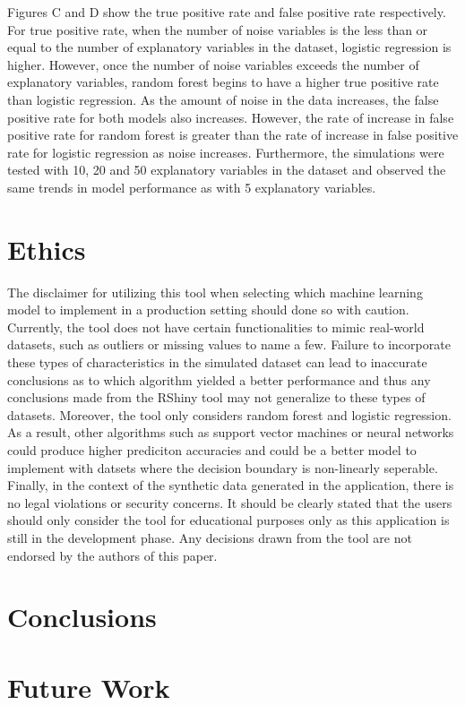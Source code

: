 \documentclass{llncs}
\begin{document}
Figures C and D show the true positive rate and false positive rate respectively.  For true positive rate, when the number of noise variables is the less than or equal to the number of explanatory variables in the dataset, logistic regression is higher.  However, once the number of noise variables exceeds the number of explanatory variables, random forest begins to have a higher true positive rate than logistic regression.  As the amount of noise in the data increases, the false positive rate for both models also increases.  However, the rate of increase in false positive rate for random forest is greater than the rate of increase in false positive rate for logistic regression as noise increases. Furthermore, the simulations were tested with 10, 20 and 50 explanatory variables in the dataset and observed the same trends in model performance as with 5 explanatory variables.

\section{Ethics}

The disclaimer for utilizing this tool when selecting which machine learning model to implement in a production setting should done so with caution. Currently, the tool does not have certain functionalities to mimic real-world datasets, such as outliers or missing values to name a few. Failure to incorporate these types of characteristics in the simulated dataset can lead to inaccurate conclusions as to which algorithm yielded a better performance and thus any conclusions made from the RShiny tool may not generalize to these types of datasets. Moreover, the tool only considers random forest and logistic regression. As a result, other algorithms such as support vector machines or neural networks could produce higher prediciton accuracies and could be a better model to implement with datsets where the decision boundary is non-linearly seperable. Finally, in the context of the synthetic data generated in the application, there is no legal violations or security concerns. It should be clearly stated that the users should only consider the tool for educational purposes only as this application is still in the development phase. Any decisions drawn from the tool are not endorsed by the authors of this paper.


\section{Conclusions}


\section{Future Work}
\end{document}
